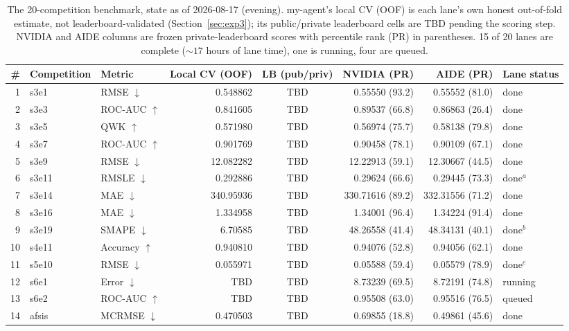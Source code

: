 \documentclass[11pt,a4paper]{article}
\newcommand{\dn}{\ensuremath{\downarrow}}
\newcommand{\up}{\ensuremath{\uparrow}}
\begin{document}
\begin{table}[htbp]
\centering\footnotesize
\setlength{\tabcolsep}{4pt}
\caption{The 20-competition benchmark, state as of 2026-08-17 (evening). my-agent's local CV
(OOF) is each lane's own honest out-of-fold estimate, not leaderboard-validated
(Section~\ref{sec:exp3}); its public/private leaderboard cells are TBD pending the scoring
step. NVIDIA and AIDE columns are frozen private-leaderboard scores with percentile rank (PR)
in parentheses. 15 of 20 lanes are complete (${\sim}17$ hours of lane time), one is running,
four are queued.}
\label{tab:bench}
\begin{tabular}{@{}rllrcrrl@{}}
\toprule
\# & \textbf{Competition} & \textbf{Metric} & \textbf{Local CV (OOF)} & \textbf{LB (pub/priv)} & \textbf{NVIDIA (PR)} & \textbf{AIDE (PR)} & \textbf{Lane status} \\
\midrule
1 & s3e1 & RMSE \dn & 0.548862 & TBD & 0.55550 (93.2) & 0.55552 (81.0) & done \\
2 & s3e3 & ROC-AUC \up & 0.841605 & TBD & 0.89537 (66.8) & 0.86863 (26.4) & done \\
3 & s3e5 & QWK \up & 0.571980 & TBD & 0.56974 (75.7) & 0.58138 (79.8) & done \\
4 & s3e7 & ROC-AUC \up & 0.901769 & TBD & 0.90458 (78.1) & 0.90109 (67.1) & done \\
5 & s3e9 & RMSE \dn & 12.082282 & TBD & 12.22913 (59.1) & 12.30667 (44.5) & done \\
6 & s3e11 & RMSLE \dn & 0.292886 & TBD & 0.29624 (66.6) & 0.29445 (73.3) & done$^{a}$ \\
7 & s3e14 & MAE \dn & 340.95936 & TBD & 330.71616 (89.2) & 332.31556 (71.2) & done \\
8 & s3e16 & MAE \dn & 1.334958 & TBD & 1.34001 (96.4) & 1.34224 (91.4) & done \\
9 & s3e19 & SMAPE \dn & 6.70585 & TBD & 48.26558 (41.4) & 48.34131 (40.1) & done$^{b}$ \\
10 & s4e11 & Accuracy \up & 0.940810 & TBD & 0.94076 (52.8) & 0.94056 (62.1) & done \\
11 & s5e10 & RMSE \dn & 0.055971 & TBD & 0.05588 (59.4) & 0.05579 (78.9) & done$^{c}$ \\
12 & s6e1 & Error \dn & TBD & TBD & 8.73239 (69.5) & 8.72191 (74.8) & running \\
13 & s6e2 & ROC-AUC \up & TBD & TBD & 0.95508 (63.0) & 0.95516 (76.5) & queued \\
14 & afsis & MCRMSE \dn & 0.470503 & TBD & 0.69855 (18.8) & 0.49861 (45.6) & done \\

\end{tabular}
\end{table}
\end{document}
